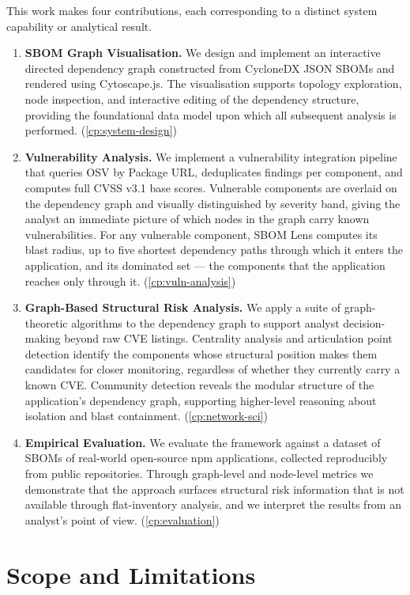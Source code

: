This work makes four contributions, each corresponding to a distinct system capability or analytical result.

\begin{enumerate}
    \item \textbf{SBOM Graph Visualisation.} We design and implement an interactive directed dependency graph constructed from CycloneDX JSON SBOMs and rendered using Cytoscape.js. The visualisation supports topology exploration, node inspection, and interactive editing of the dependency structure, providing the foundational data model upon which all subsequent analysis is performed. (\autoref{cp:system-design})
    \item \textbf{Vulnerability Analysis.} We implement a vulnerability integration pipeline that queries OSV by Package URL, deduplicates findings per component, and computes full CVSS v3.1 base scores. Vulnerable components are overlaid on the dependency graph and visually distinguished by severity band, giving the analyst an immediate picture of which nodes in the graph carry known vulnerabilities. For any vulnerable component, SBOM Lens computes its blast radius, up to five shortest dependency paths through which it enters the application, and its dominated set --- the components that the application reaches only through it. (\autoref{cp:vuln-analysis})
    \item \textbf{Graph-Based Structural Risk Analysis.} We apply a suite of graph-theoretic algorithms to the dependency graph to support analyst decision-making beyond raw CVE listings. Centrality analysis and articulation point detection identify the components whose structural position makes them candidates for closer monitoring, regardless of whether they currently carry a known CVE. Community detection reveals the modular structure of the application's dependency graph, supporting higher-level reasoning about isolation and blast containment. (\autoref{cp:network-sci})
    \item \textbf{Empirical Evaluation.} We evaluate the framework against a dataset of SBOMs of real-world open-source npm applications, collected reproducibly from public repositories. Through graph-level and node-level metrics we demonstrate that the approach surfaces structural risk information that is not available through flat-inventory analysis, and we interpret the results from an analyst's point of view. (\autoref{cp:evaluation})
\end{enumerate}


\section{Scope and Limitations}
\label{sec:scope}

